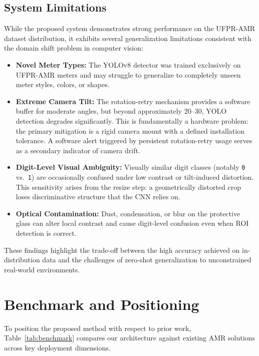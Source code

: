 \documentclass[11pt,a4paper]{article}
\begin{document}
\subsection{System Limitations}
While the proposed system demonstrates strong performance on the UFPR-AMR dataset distribution, it exhibits several generalization limitations consistent with the domain shift problem in computer vision:
\begin{itemize}
    \item \textbf{Novel Meter Types:} The YOLOv8 detector was trained exclusively on UFPR-AMR meters and may struggle to generalize to completely unseen meter styles, colors, or shapes.
    \item \textbf{Extreme Camera Tilt:} The rotation-retry mechanism provides a software buffer for moderate angles, but beyond approximately 20\textdegree--30\textdegree, YOLO detection degrades significantly. This is fundamentally a hardware problem: the primary mitigation is a rigid camera mount with a defined installation tolerance. A software alert triggered by persistent rotation-retry usage serves as a secondary indicator of camera drift.
    \item \textbf{Digit-Level Visual Ambiguity:} Visually similar digit classes (notably \texttt{0} vs.\ \texttt{1}) are occasionally confused under low contrast or tilt-induced distortion. This sensitivity arises from the resize step: a geometrically distorted crop loses discriminative structure that the CNN relies on.
    \item \textbf{Optical Contamination:} Dust, condensation, or blur on the protective glass can alter local contrast and cause digit-level confusion even when ROI detection is correct.
\end{itemize}
These findings highlight the trade-off between the high accuracy achieved on in-distribution data and the challenges of zero-shot generalization to unconstrained real-world environments.

\section{Benchmark and Positioning}

To position the proposed method with respect to prior work, Table~\ref{tab:benchmark} compares our architecture against existing AMR solutions across key deployment dimensions.
\end{document}

